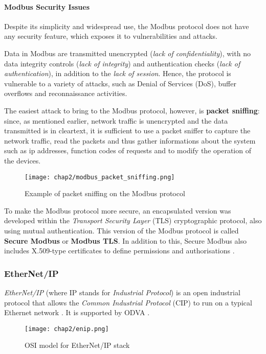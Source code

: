 \paragraph{Modbus Security Issues}
\label{subsub:modbus_sec}
Despite its simplicity and widespread use, the Modbus protocol does not have any security feature, which exposes it to vulnerabilities and attacks.

Data in Modbus are transmitted unencrypted (\textit{lack of confidentiality}), with no data integrity controls (\textit{lack of integrity}) and authentication checks (\textit{lack of authentication}), in addition to the \textit{lack of session}. Hence, the protocol is vulnerable to a variety of attacks, such as Denial of Services (DoS), buffer overflows and reconnaissance activities.

\bigskip
The easiest attack to bring to the Modbus protocol, however, is \textbf{packet sniffing}: since, as mentioned earlier, network traffic is unencrypted and the data transmitted is in cleartext, it is sufficient to use a packet sniffer to capture the network traffic, read the packets and thus gather informations about the system such as ip addresses, function codes of requests and to modify the operation of the devices.

\begin{figure}[ht]
	\centering
	\texttt{[image: chap2/modbus\_packet\_sniffing.png]}
	\caption{Example of packet sniffing on the Modbus protocol}
	\label{fig:modbus_packet_sniffing}
\end{figure}

To make the Modbus protocol more secure, an encapsulated version was developed within the \textit{Transport Security Layer} (TLS) cryptographic protocol, also using mutual authentication. This version of the Modbus protocol is called \textbf{Secure Modbus} or \textbf{Modbus TLS}. In addition to this, Secure Modbus also includes X.509-type certificates to define permissions and authorisations \cite{modbus_tls_pdf}.

\subsubsection{EtherNet/IP}
\label{subsub:enip}
\textit{EtherNet/IP} (where IP stands for \textit{Industrial Protocol}) is an open industrial protocol that allows the \textit{Common Industrial Protocol} (CIP) to run on a typical Ethernet network \cite{enip_pdf}. It is supported by ODVA \cite{odva_url}.

\begin{figure}[ht]
	\centering
	\texttt{[image: chap2/enip.png]}
	\caption{OSI model for EtherNet/IP stack}
	\label{fig:enip}
\end{figure}

